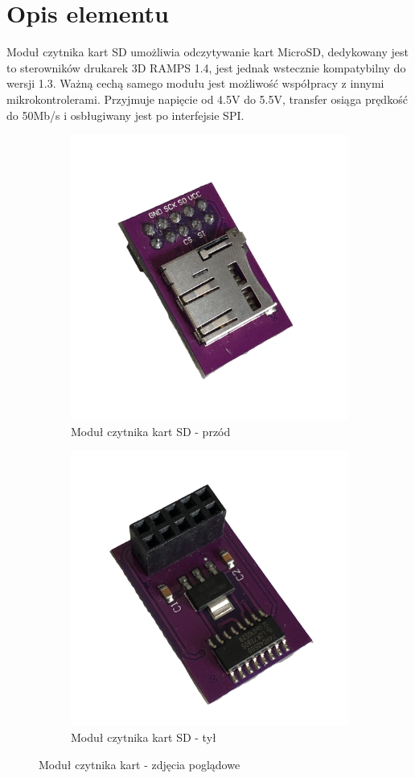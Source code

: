 \documentclass[11pt, a4paper]{article}
\author{Dawid Wasung}
\institute{Instytut Robotyki i Inteligencji Maszynowej}
\begin{document}
\newpage

\section*{Opis elementu} 
Moduł czytnika kart SD umożliwia odczytywanie kart MicroSD, dedykowany jest to sterowników drukarek 3D RAMPS 1.4, jest jednak wstecznie kompatybilny do wersji 1.3. Ważną cechą samego modułu jest możliwość współpracy z innymi mikrokontrolerami. Przyjmuje napięcie od 4.5V do 5.5V, transfer osiąga prędkość do 50Mb/s i osbługiwany jest po interfejsie SPI.
\vspace{0.5cm}
\begin{figure}[h!]
\centering
\begin{subfigure}{.5\textwidth}
  \centering
  \includegraphics[width=.72\linewidth]{fig/SD/zdj_modułu/front.png}
  \caption{Moduł czytnika kart SD - przód}
  \label{fig:sub1}
\end{subfigure}%
\begin{subfigure}{.5\textwidth}
  \centering
  \includegraphics[width=0.748\linewidth]{fig/SD/zdj_modułu/back.png}
  \caption{Moduł czytnika kart SD - tył}
  \label{fig:sub2}
\end{subfigure}
\caption{Moduł czytnika kart - zdjęcia poglądowe}
\label{fig:test}
\end{figure}
\end{document}
